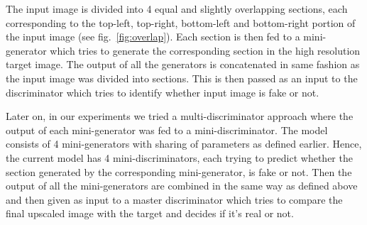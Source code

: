 \documentclass[12pt,a4paper,twocolumn]{article}
\begin{document}
        The input image is divided into 4 equal and slightly overlapping sections, each corresponding to the top-left, top-right, bottom-left and bottom-right portion of the input image (see fig.~\ref{fig:overlap}).
        Each section is then fed to a mini-generator which tries to generate the corresponding section in the high resolution target image.
        The output of all the generators is concatenated in same fashion as the input image was divided into sections.
        This is then passed as an input to the discriminator which tries to identify whether input image is fake or not.

        Later on, in our experiments we tried a multi-discriminator approach where the output of each mini-generator was fed to a mini-discriminator.
        The model consists of 4 mini-generators with sharing of parameters as defined earlier.
        Hence, the current model has 4 mini-discriminators, each trying to predict whether the section generated by the corresponding mini-generator, is fake or not.
        Then the output of all the mini-generators are combined in the same way as defined above and then given as input to a master discriminator which tries to compare the final upscaled image with the target and decides if it's real or not.
\end{document}
